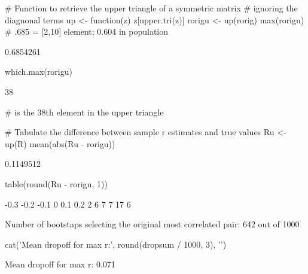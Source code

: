 \begin{Schunk}
\begin{Sinput}
# Function to retrieve the upper triangle of a symmetric matrix
# ignoring the diagnonal terms
up <- function(z) z[upper.tri(z)]
rorigu <- up(rorig)
max(rorigu)   # .685 = [2,10] element; 0.604 in population
\end{Sinput}
\begin{Soutput}
[1] 0.6854261
\end{Soutput}
\begin{Sinput}
which.max(rorigu)
\end{Sinput}
\begin{Soutput}
[1] 38
\end{Soutput}
\begin{Sinput}
# is the 38th element in the upper triangle

# Tabulate the difference between sample r estimates and true values
Ru <- up(R)
mean(abs(Ru - rorigu))
\end{Sinput}
\begin{Soutput}
[1] 0.1149512
\end{Soutput}
\begin{Sinput}
table(round(Ru - rorigu, 1))
\end{Sinput}
\begin{Soutput}

-0.3 -0.2 -0.1    0  0.1  0.2 
   2    6    7    7   17    6 
\end{Soutput}
\begin{Soutput}
Number of bootstaps selecting the original most correlated pair: 642 out of 1000 
\end{Soutput}
\begin{Sinput}
cat('Mean dropoff for max r:', round(dropsum / 1000, 3), '\n')
\end{Sinput}
\begin{Soutput}
Mean dropoff for max r: 0.071 
\end{Soutput}
\end{Schunk}

